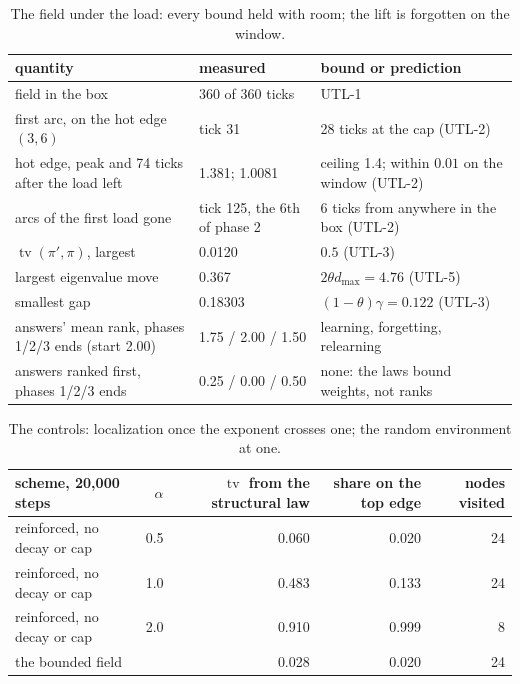 \documentclass[11pt,a4paper]{article}
\theoremstyle{plain}
\theoremstyle{definition}
\DeclareMathOperator{\tv}{tv}
\begin{document}
\begin{table}[ht]
\centering\footnotesize
\begin{tabular}{p{5.9cm}p{3.2cm}p{5.1cm}}
\toprule
quantity & measured & bound or prediction \\
\midrule
field in the box & 360 of 360 ticks & UTL-1 \\
first arc, on the hot edge $(3, 6)$ & tick 31 & 28 ticks at the cap (UTL-2) \\
hot edge, peak and 74 ticks after the load left & 1.381; 1.0081 & ceiling 1.4; within $0.01$ on the window (UTL-2) \\
arcs of the first load gone & tick 125, the 6th of phase 2 & 6 ticks from anywhere in the box (UTL-2) \\
$\tv(\pi', \pi)$, largest & 0.0120 & $0.5$ (UTL-3) \\
largest eigenvalue move & 0.367 & $2\theta d_{\max} = 4.76$ (UTL-5) \\
smallest gap & 0.18303 & $(1-\theta)\gamma = 0.122$ (UTL-3) \\
answers' mean rank, phases 1/2/3 ends (start 2.00) & 1.75 / 2.00 / 1.50 & learning, forgetting, relearning \\
answers ranked first, phases 1/2/3 ends & 0.25 / 0.00 / 0.50 & none: the laws bound weights, not ranks \\
\bottomrule
\end{tabular}
\caption{The field under the load: every bound held with room; the lift is forgotten on the window.}
\label{tab:field}
\end{table}

\begin{table}[ht]
\centering\footnotesize
\begin{tabular}{lrrrr}
\toprule
scheme, 20{,}000 steps & $\alpha$ & $\tv$ from the structural law & share on the top edge & nodes visited \\
\midrule
reinforced, no decay or cap & 0.5 & 0.060 & 0.020 & 24 \\
reinforced, no decay or cap & 1.0 & 0.483 & 0.133 & 24 \\
reinforced, no decay or cap & 2.0 & 0.910 & 0.999 & 8 \\
the bounded field & & 0.028 & 0.020 & 24 \\
\bottomrule
\end{tabular}
\caption{The controls: localization once the exponent crosses one; the random environment at one.}
\label{tab:controls}
\end{table}
\end{document}
